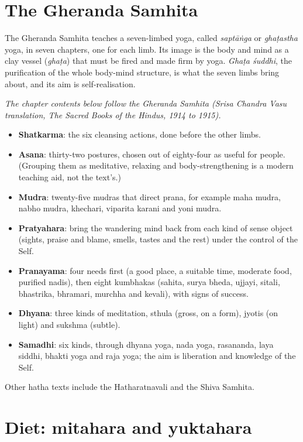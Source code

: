 \section{The Gheranda Samhita}

The Gheranda Samhita teaches a seven-limbed yoga, called \emph{saptāṅga} or \emph{ghaṭastha} yoga, in seven chapters, one for each limb. Its image is the body and mind as a clay vessel (\emph{ghaṭa}) that must be fired and made firm by yoga. \emph{Ghaṭa śuddhi}, the purification of the whole body-mind structure, is what the seven limbs bring about, and its aim is self-realisation.

\textit{The chapter contents below follow the Gheranda Samhita (Srisa Chandra Vasu translation, The Sacred Books of the Hindus, 1914 to 1915).}
\begin{itemize}
\item \textbf{Shatkarma}: the six cleansing actions, done before the other limbs.
\item \textbf{Asana}: thirty-two postures, chosen out of eighty-four as useful for people. (Grouping them as meditative, relaxing and body-strengthening is a modern teaching aid, not the text's.)
\item \textbf{Mudra}: twenty-five mudras that direct prana, for example maha mudra, nabho mudra, khechari, viparita karani and yoni mudra.
\item \textbf{Pratyahara}: bring the wandering mind back from each kind of sense object (sights, praise and blame, smells, tastes and the rest) under the control of the Self.
\item \textbf{Pranayama}: four needs first (a good place, a suitable time, moderate food, purified nadis), then eight kumbhakas (sahita, surya bheda, ujjayi, sitali, bhastrika, bhramari, murchha and kevali), with signs of success.
\item \textbf{Dhyana}: three kinds of meditation, sthula (gross, on a form), jyotis (on light) and sukshma (subtle).
\item \textbf{Samadhi}: six kinds, through dhyana yoga, nada yoga, rasananda, laya siddhi, bhakti yoga and raja yoga; the aim is liberation and knowledge of the Self.
\end{itemize}
Other hatha texts include the Hatharatnavali and the Shiva Samhita.

\section{Diet: mitahara and yuktahara}

